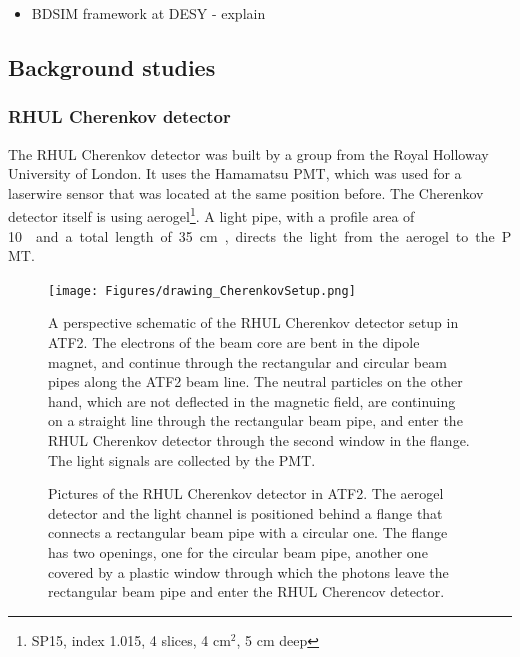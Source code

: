 \begin{itemize}
 \item BDSIM framework at DESY - explain
\end{itemize}

\subsection{Background studies}
\subsubsection{RHUL Cherenkov detector}
\label{RHUL}

The RHUL Cherenkov detector was built by a group from the Royal Holloway University of London. It uses the Hamamatsu PMT, which was used for a laserwire sensor that was located at the same position before. The Cherenkov detector itself is using aerogel\footnote{SP15, index 1.015, 4 slices, 4 cm$^2$, 5 cm deep}. A light pipe, with a profile area of \SI{10}{\centi\metre\square} and a total length of \SI{35}{\centi\metre}, directs the light from the aerogel to the PMT.

\begin{figure}
\centering
\texttt{[image: Figures/drawing\_CherenkovSetup.png]}
\caption[Schematic drawing of the RHUL Cherenkov detector setup]{A perspective schematic of the RHUL Cherenkov detector setup in ATF2. The electrons of the beam core are bent in the dipole magnet, and continue through the rectangular and circular beam pipes along the ATF2 beam line. The neutral particles on the other hand, which are not deflected in the magnetic field, are continuing on a straight line through the rectangular beam pipe, and enter the RHUL Cherenkov detector through the second window in the flange. The light signals are collected by the PMT.}
\label{fig:RHUL_Cherenkov_Drawing}
\end{figure}

\begin{figure}
\begin{center}
\caption[Pictures of the RHUL Cherenkov detector]{Pictures of the RHUL Cherenkov detector in ATF2. The aerogel detector and the light channel is positioned behind a flange that connects a rectangular beam pipe with a circular one. The flange has two openings, one for the circular beam pipe, another one covered by a plastic window through which the photons leave the rectangular beam pipe and enter the RHUL Cherencov detector.}
\label{fig:RHUL_Cherenkov}
\end{center}
\end{figure}

